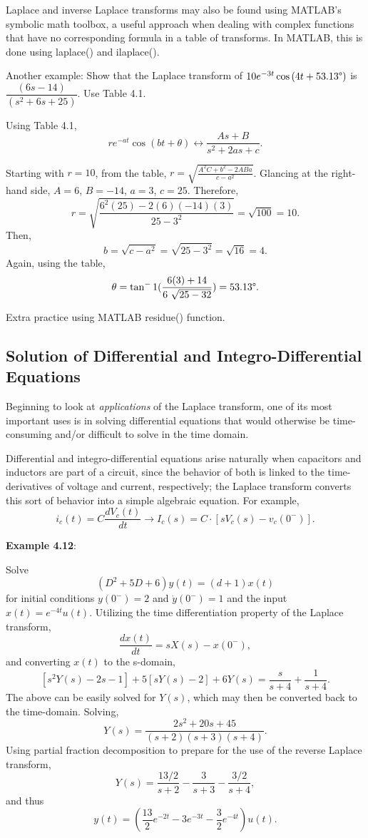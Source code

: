 \documentclass{article}
\begin{document}
Laplace and inverse Laplace transforms may also be found using MATLAB's symbolic math toolbox, a useful approach when dealing with complex functions that have no corresponding formula in a table of transforms. In MATLAB, this is done using laplace() and ilaplace().

Another example: Show that the Laplace transform of \(10e^{-3t} \cos{(4t + 53.13 \degree)}\) is \(\dfrac{(6s-14)}{(s^2+6s+25)}\). Use Table 4.1.

Using Table 4.1, 
\[
	re^{-at}\cos{(bt + \theta) \longleftrightarrow \frac{As+B}{s^2+2as+c}}.
\]

Starting with \(r=10\), from the table, \(r = \sqrt{\frac{A^2C+b^2-2ABa}{c-a^2}}\). Glancing at the right-hand side, \(A=6\), \(B=-14\), \(a=3\), \(c=25\). Therefore, 
\[
  r = \sqrt{\frac{6^2(25) - 2(6)(-14)(3)}{25-3^2}} = \sqrt{100} = 10.
\]
Then,
\[
  b=\sqrt{c-a^2} = \sqrt{25-3^2} = \sqrt{16} = 4.
\]
Again, using the table, 
\[
	\theta = \tan^-1{(\frac{6(3) + 14}{6 \ \sqrt{25-32}})} = 53.13 \degree.
\]

Extra practice using MATLAB residue() function.

\setcounter{subsection}{2}
\subsection{Solution of Differential and Integro-Differential Equations}
Beginning to look at \textit{applications} of the Laplace transform, one of its most important uses is in solving differential equations that would otherwise be time-consuming and/or difficult to solve in the time domain.

Differential and integro-differential equations arise naturally when capacitors and inductors are part of a circuit, since the behavior of both is linked to the time-derivatives of voltage and current, respectively; the Laplace transform converts this sort of behavior into a simple algebraic equation. For example, 
\[
	i_c(t) = C \frac{dV_c(t)}{dt} \to I_c(s) = C \cdot [sV_c(s) - v_c(0^-)].
\]

\textbf{Example 4.12}:

Solve 
\[
	(D^2 + 5D +6)y(t) = (d+1)x(t)
\]
for initial conditions \(y(0^-) = 2\) and \(\dot{y}(0^-) = 1\) and the input \(x(t) = e^{-4t}u(t)\).
Utilizing the time differentiation property of the Laplace transform,
\[
  \frac{dx(t)}{dt} = sX(s) - x(0^-),
\]
and converting \(x(t)\) to the s-domain,
\[
	[s^2Y(s) - 2s -1]+5[sY(s) -2]+6Y(s) = \frac{s}{s+4}+\frac{1}{s+4}.
\]
The above can be easily solved for \(Y(s)\), which may then be converted back to the time-domain. Solving, 
\[
  Y(s) = \frac{2s^2+20s+45}{(s+2)(s+3)(s+4)}.
\]
Using partial fraction decomposition to prepare for the use of the reverse Laplace transform,
\[
  Y(s) = \frac{13/2}{s+2}-\frac{3}{s+3}-\frac{3/2}{s+4},
\]
and thus
\[
	y(t) = (\frac{13}{2}e^{-2t}-3e^{-3t}-\frac{3}{2}e^{-4t})u(t).
\]
\end{document}
